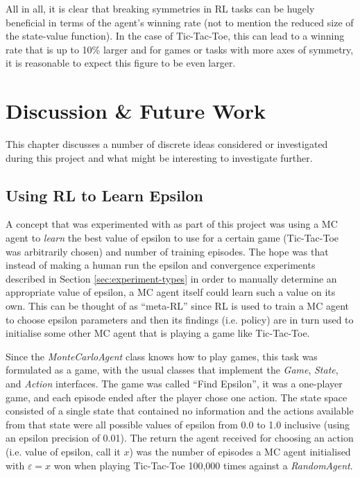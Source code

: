 \documentclass[11pt,a4paper,twoside,openright]{report}
\begin{document}
All in all, it is clear that breaking symmetries in RL tasks can be hugely beneficial in terms of the agent's winning rate (not to mention the reduced size of the state-value function). In the case of Tic-Tac-Toe, this can lead to a winning rate that is up to 10\% larger and for games or tasks with more axes of symmetry, it is reasonable to expect this figure to be even larger.


\chapter{Discussion \& Future Work}

This chapter discusses a number of discrete ideas considered or investigated during this project and what might be interesting to investigate further.


\section{Using RL to Learn Epsilon}

A concept that was experimented with as part of this project was using a MC agent to \emph{learn} the best value of epsilon to use for a certain game (Tic-Tac-Toe was arbitrarily chosen) and number of training episodes. The hope was that instead of making a human run the epsilon and convergence experiments described in Section \ref{sec:experiment-types} in order to manually determine an appropriate value of epsilon, a MC agent itself could learn such a value on its own. This can be thought of as ``meta-RL'' since RL is used to train a MC agent to choose epsilon parameters and then its findings (i.e. policy) are in turn used to initialise some other MC agent that is playing a game like Tic-Tac-Toe.

Since the \emph{MonteCarloAgent} class knows how to play games, this task was formulated as a game, with the usual classes that implement the \emph{Game}, \emph{State}, and \emph{Action} interfaces. The game was called ``Find Epsilon'', it was a one-player game, and each episode ended after the player chose one action. The state space consisted of a single state that contained no information and the actions available from that state were all possible values of epsilon from 0.0 to 1.0 inclusive (using an epsilon precision of 0.01). The return the agent received for choosing an action (i.e. value of epsilon, call it $x$) was the number of episodes a MC agent initialised with $\varepsilon = x$ won when playing Tic-Tac-Toe 100,000 times against a \emph{RandomAgent}.
\end{document}
